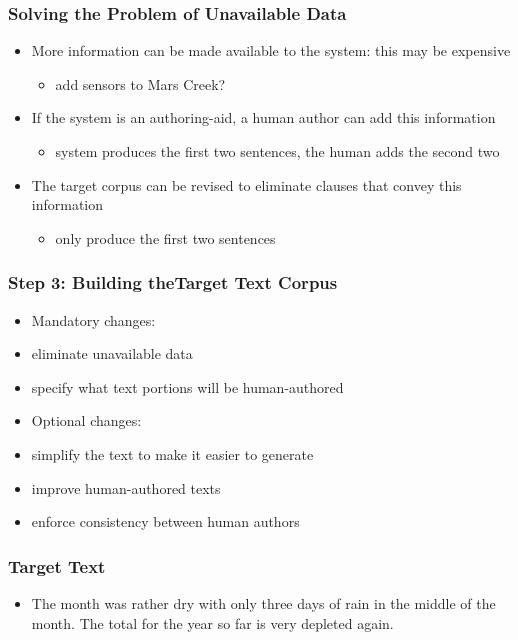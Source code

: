 \documentclass[compress,color=usenames]{beamer}
\begin{document}
\begin{frame}
\frametitle{Solving the Problem of Unavailable Data}

\begin{itemize}
\item { {More information can be made available to the system: this may be expensive}}
    \begin{itemize}
        \item add sensors to Mars Creek?
    \end{itemize}
\item { {If the system is an authoring-aid, a human author can add this information}}
    \begin{itemize}
    \item system produces the first two sentences, the human adds the second two
    \end{itemize}
\item { {The target corpus can be revised to eliminate clauses that convey this information}}
    \begin{itemize}
    \item only produce the first two sentences
    \end{itemize}
\end{itemize}

\end{frame}

\begin{frame}
\frametitle{Step 3: Building theTarget Text Corpus}

\begin{itemize}
\item { {Mandatory changes:}}
\item { {eliminate unavailable data}}
\item { {specify what text portions will be human-authored}}
\item { {Optional changes:}}
\item { {simplify the text to make it easier to generate }}
\item { {improve human-authored texts}}
\item { {enforce consistency between human authors}}
\end{itemize}

\end{frame}

\begin{frame}
\frametitle{Target Text}

\begin{itemize}
\item { {The month was rather dry with only three days of rain in the middle of the month. The total for the year so far is very depleted again.}}
\end{itemize}

\end{frame}
\end{document}
